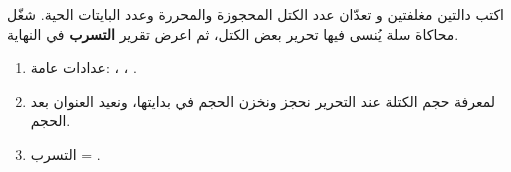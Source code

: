 \begin{statement}
اكتب دالتين مغلفتين  و  تعدّان عدد الكتل المحجوزة والمحررة وعدد البايتات الحية. شغّل محاكاة سلة يُنسى فيها تحرير بعض الكتل، ثم اعرض تقرير \textbf{التسرب} في النهاية.
\end{statement}
\begin{stepsbox}\begin{enumerate}
\item عدادات عامة: ، ، .
\item لمعرفة حجم الكتلة عند التحرير نحجز  ونخزن الحجم في بدايتها، ونعيد العنوان بعد الحجم.
\item التسرب = .
\end{enumerate}\end{stepsbox}
